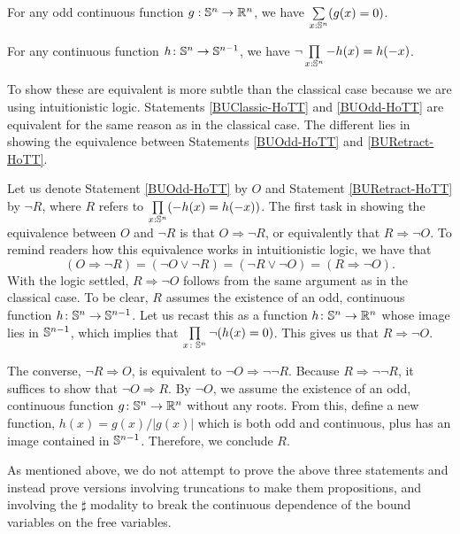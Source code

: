 \documentclass{amsart}
\begin{document}
\begin{statement}\label{BUOdd-HoTT}
  For any odd continuous function $g: \mathbb{S}^n \rightarrow \mathbb{R}^n$, we have
  $\sum\limits_{x : \mathbb{S}^n} (g(x) = 0)$.
\end{statement}

\begin{statement}\label{BURetract-HoTT}
  For any continuous function $h \colon \mathbb{S}^n \to \mathbb{S}^{n-1}$, we
  have $\neg \prod\limits_{x : \mathbb{S}^n} -h(x) = h(-x)$.
\end{statement}

To show these are equivalent is more subtle than the classical case
because we are using intuitionistic logic.  Statements
\ref{BUClassic-HoTT} and \ref{BUOdd-HoTT} are equivalent for the same
reason as in the classical case. The different lies in showing the
equivalence between Statements \ref{BUOdd-HoTT} and
\ref{BURetract-HoTT}.

Let us denote Statement \ref{BUOdd-HoTT} by $O$ and Statement
\ref{BURetract-HoTT} by $\neg R$, where $R$ refers to
$\prod\limits_{x : \mathbb{S}^n} (-h(x) = h(-x))$. The first task in showing
the equivalence between $O$ and $\neg R$ is that
$O \Rightarrow \neg R $, or equivalently that $R \Rightarrow \neg
O$. To remind readers how this equivalence works in intuitionistic
logic, we have that
\[
  (O \Rightarrow \neg R)
  = (\neg O \lor \neg R)
  = (\neg R \lor \neg O)
  = (R \Rightarrow \neg O).
\]
With the logic settled, $R \Rightarrow \neg O$ follows from the same
argument as in the classical case. To be clear, $R$ assumes the
existence of an odd, continuous function
$h \colon \mathbb{S}^{n} \to \mathbb{S}^{n-1}$. Let us recast this as a function
$h \colon \mathbb{S}^n \to \mathbb{R}^n$ whose image lies in $\mathbb{S}^{n-1}$, which
implies that $\prod\limits_{x \colon \mathbb{S}^n} \neg (h(x)=0)$. This gives
us that $R \Rightarrow \neg O$.

The converse, $\neg R \Rightarrow O$, is equivalent to
$\neg O \Rightarrow \neg\neg R$. Because $R \Rightarrow \neg \neg R$,
it suffices to show that $\neg O \Rightarrow R$. By $\neg O$, we
assume the existence of an odd, continuous function
$g \colon \mathbb{S}^n \to \mathbb{R}^n$ without any roots.  From this, define a new
function, $h(x) = g(x)/\vert g(x) \vert$ which is both odd and
continuous, plus has an image contained in $\mathbb{S}^{n-1}$. Therefore, we
conclude $R$.

As mentioned above, we do not attempt to prove the above three
statements and instead prove versions involving truncations to make
them propositions, and involving the $\sharp$ modality to break the
continuous dependence of the bound variables on the free variables.  
\end{document}
